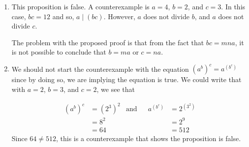\begin{enumerate}
\begin{enumerate}
\item This proposition is false.  A counterexample is $a = 4$, $b = 2$, and $c = 3$.  In this case, 
$bc = 12$ and so, $a \mid (bc)$.  However, $a$ does not divide $b$, and $a$ does not divide $c$.

\vskip6pt
\noindent
The problem with the proposed proof is that from the fact that $bc = mna$, it is not possible to conclude that $b = ma$ or $c = na$.


\item We should not start the counterexample with the equation $\left( a^b \right)^c = a^{\left( b^c \right)}$ since by doing so, we are implying the equation is true.  We could write that with $a = 2$, $b = 3$, and $c = 2$, we see that

\begin{align*}
\left( a^b \right)^c &= \left( 2^3 \right)^2 &\text{and}& &a^{\left( b^c \right)} &= 2^{\left( 3^2 \right)} \\
                   &= 8^2  & & & &= 2^9\\
                   &= 64   & & & &= 512
\end{align*}
Since $64 \ne 512$, this is a counterexample that shows the proposition is false.
\end{enumerate}
\end{enumerate}


